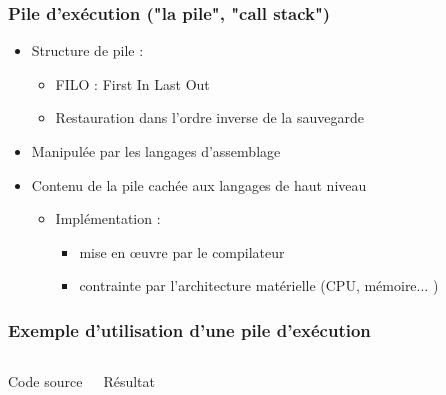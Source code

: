 \begin{frame}
\frametitle{Pile d'exécution ("la pile", "call stack")}
\begin{itemize}
\item Structure de pile :
\begin{itemize}
\item FILO : First In Last Out
\item Restauration dans l'ordre inverse de la sauvegarde
\end{itemize}

\item <2->Manipulée par les langages d'assemblage
\item <2->Contenu de la pile cachée aux langages de haut niveau
\begin{itemize}
  \item Implémentation :
  \begin{itemize}
    \item mise en œuvre par le compilateur
    \item contrainte par l'architecture matérielle (CPU, mémoire... )
  \end{itemize}
\end{itemize}
\end{itemize}
\end{frame}


\begin{frame}
\frametitle{Exemple d'utilisation d'une pile d'exécution}
\begin{columns}
\begin{block}{Code source}
\tiny{}
\end{block}
\begin{exampleblock}{Résultat}
\tiny{}
\end{exampleblock}
\end{columns}
\end{frame}

